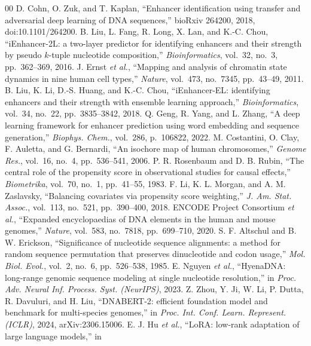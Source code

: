 \documentclass[journal,onecolumn,10pt,letterpaper]{IEEEtran}
\begin{document}
\begin{thebibliography}{00}
 D. Cohn, O. Zuk, and T. Kaplan, ``Enhancer identification using transfer and
adversarial deep learning of DNA sequences,'' bioRxiv 264200, 2018, doi:10.1101/264200.
 B. Liu, L. Fang, R. Long, X. Lan, and K.-C. Chou, ``iEnhancer-2L: a two-layer
predictor for identifying enhancers and their strength by pseudo $k$-tuple nucleotide composition,''
\emph{Bioinformatics}, vol.~32, no.~3, pp.~362--369, 2016.
 J. Ernst \emph{et al.}, ``Mapping and analysis of chromatin state dynamics in nine
human cell types,'' \emph{Nature}, vol.~473, no.~7345, pp.~43--49, 2011.
 B. Liu, K. Li, D.-S. Huang, and K.-C. Chou, ``iEnhancer-EL: identifying enhancers and
their strength with ensemble learning approach,'' \emph{Bioinformatics}, vol.~34, no.~22,
pp.~3835--3842, 2018.
 Q. Geng, R. Yang, and L. Zhang, ``A deep learning framework for enhancer prediction
using word embedding and sequence generation,'' \emph{Biophys. Chem.}, vol.~286, p.~106822, 2022.
 M. Costantini, O. Clay, F. Auletta, and G. Bernardi, ``An isochore map of
human chromosomes,'' \emph{Genome Res.}, vol.~16, no.~4, pp.~536--541, 2006.
 P. R. Rosenbaum and D. B. Rubin, ``The central role of the propensity score in
observational studies for causal effects,'' \emph{Biometrika}, vol.~70, no.~1, pp.~41--55, 1983.
 F. Li, K. L. Morgan, and A. M. Zaslavsky, ``Balancing covariates via propensity score
weighting,'' \emph{J. Am. Stat. Assoc.}, vol.~113, no.~521, pp.~390--400, 2018.
 ENCODE Project Consortium \emph{et al.}, ``Expanded encyclopaedias of DNA elements in
the human and mouse genomes,'' \emph{Nature}, vol.~583, no.~7818, pp.~699--710, 2020.
 S. F. Altschul and B. W. Erickson, ``Significance of nucleotide sequence
alignments: a method for random sequence permutation that preserves dinucleotide and codon usage,''
\emph{Mol. Biol. Evol.}, vol.~2, no.~6, pp.~526--538, 1985.
 E. Nguyen \emph{et al.}, ``HyenaDNA: long-range genomic sequence modeling at single
nucleotide resolution,'' in \emph{Proc. Adv. Neural Inf. Process. Syst. (NeurIPS)}, 2023.
 Z. Zhou, Y. Ji, W. Li, P. Dutta, R. Davuluri, and H. Liu, ``DNABERT-2: efficient
foundation model and benchmark for multi-species genomes,'' in \emph{Proc. Int. Conf. Learn. Represent.
(ICLR)}, 2024, arXiv:2306.15006.
 E. J. Hu \emph{et al.}, ``LoRA: low-rank adaptation of large language models,'' in

\end{thebibliography}
\end{document}

